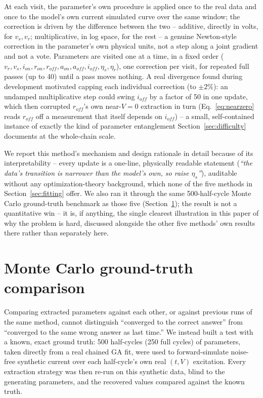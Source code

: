 \documentclass[11pt]{article}
\begin{document}
At each visit, the parameter's own procedure is applied once to the
real data and once to the model's own current simulated curve over the
same window; the correction is driven by the difference between the two
-- additive, directly in volts, for $v_s, v_r$; multiplicative, in log
space, for the rest -- a genuine Newton-style correction in the
parameter's own physical units, not a step along a joint gradient and
not a vote. Parameters are visited one at a time, in a fixed order
($v_r, v_s, i_{on}, r_{on}, r_{off}, a_{on}, a_{off}, i_{off}, \eta_s,
\eta_r$), one correction per visit, for repeated full passes (up to 40)
until a pass moves nothing. A real divergence found during development
motivated capping each individual correction (to $\pm2\%$): an
undamped multiplicative step could swing $i_{off}$ by a factor of 50 in
one update, which then corrupted $r_{off}$'s own near-$V{=}0$
extraction in turn (Eq.~\eqref{eq:nearzero} reads $r_{off}$ off a
measurement that itself depends on $i_{off}$) -- a small, self-contained
instance of exactly the kind of parameter entanglement
Section~\ref{sec:difficulty} documents at the whole-chain scale.

We report this method's mechanism and design rationale in detail because
of its interpretability -- every update is a one-line, physically
readable statement (\emph{``the data's transition is narrower than the
model's own, so raise $\eta_s$''}), auditable without any
optimization-theory background, which none of the five methods in
Section~\ref{sec:fitting} offer. We also ran it through the same
500-half-cycle Monte Carlo ground-truth benchmark as those five
(Section~\ref{sec:montecarlo}); the result is not a quantitative win --
it is, if anything, the single clearest illustration in this paper of
why the problem is hard, discussed alongside the other five methods'
own results there rather than separately here.

\section{Monte Carlo ground-truth comparison}
\label{sec:montecarlo}

Comparing extracted parameters against each other, or against previous runs
of the same method, cannot distinguish ``converged to the correct answer''
from ``converged to the same wrong answer as last time.'' We instead built
a test with a known, exact ground truth: 500 half-cycles (250 full cycles)
of parameters, taken directly from a real chained GA fit, were used to
forward-simulate noise-free synthetic current over each half-cycle's own
real $(t,V)$ excitation. Every extraction strategy was then re-run on this
synthetic data, blind to the generating parameters, and the recovered
values compared against the known truth.
\end{document}
